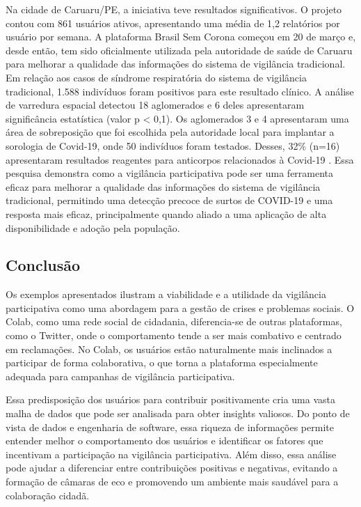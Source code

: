 Na cidade de Caruaru/PE, a iniciativa teve resultados significativos. O projeto contou com 861 usuários ativos, apresentando uma média de 1,2 relatórios por usuário por semana. A plataforma Brasil Sem Corona começou em 20 de março e, desde então, tem sido oficialmente utilizada pela autoridade de saúde de Caruaru para melhorar a qualidade das informações do sistema de vigilância tradicional. Em relação aos casos de síndrome respiratória do sistema de vigilância tradicional, 1.588 indivíduos foram positivos para este resultado clínico. A análise de varredura espacial detectou 18 aglomerados e 6 deles apresentaram significância estatística (valor p < 0,1). Os aglomerados 3 e 4 apresentaram uma área de sobreposição que foi escolhida pela autoridade local para implantar a sorologia de Covid-19, onde 50 indivíduos foram testados. Desses, 32\% (n=16) apresentaram resultados reagentes para anticorpos relacionados à Covid-19 \cite[1]{2020_LealNeto}. Essa pesquisa demonstra como a vigilância participativa pode ser uma ferramenta eficaz para melhorar a qualidade das informações do sistema de vigilância tradicional, permitindo uma detecção precoce de surtos de COVID-19 e uma resposta mais eficaz, principalmente quando aliado a uma aplicação de alta disponibilidade e adoção pela população.

\subsection*{Conclusão}
Os exemplos apresentados ilustram a viabilidade e a utilidade da vigilância participativa como uma abordagem para a gestão de crises e problemas sociais. O Colab, como uma rede social de cidadania, diferencia-se de outras plataformas, como o Twitter, onde o comportamento tende a ser mais combativo e centrado em reclamações. No Colab, os usuários estão naturalmente mais inclinados a participar de forma colaborativa, o que torna a plataforma especialmente adequada para campanhas de vigilância participativa.

Essa predisposição dos usuários para contribuir positivamente cria uma vasta malha de dados que pode ser analisada para obter insights valiosos. Do ponto de vista de dados e engenharia de software, essa riqueza de informações permite entender melhor o comportamento dos usuários e identificar os fatores que incentivam a participação na vigilância participativa. Além disso, essa análise pode ajudar a diferenciar entre contribuições positivas e negativas, evitando a formação de câmaras de eco e promovendo um ambiente mais saudável para a colaboração cidadã.

